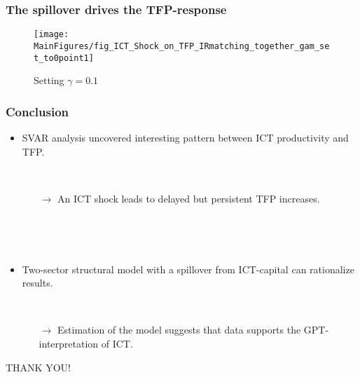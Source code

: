 \documentclass{beamer}
\def \MainFigures{../Draft_Summer2018/MainFigures}
\begin{document}
\begin{frame}
	\frametitle{The spillover drives the TFP-response}
\begin{figure}[h!]
\begin{center}
\texttt{[image: \\MainFigures/fig\_ICT\_Shock\_on\_TFP\_IRmatching\_together\_gam\_set\_to0point1]}
\caption{Setting $\gamma =0.1$}
\label{fig:TFP_main}
\end{center}
\end{figure}	

\end{frame}


\begin{frame}
	\frametitle{Conclusion}

\begin{itemize}
\item SVAR analysis uncovered interesting pattern between ICT productivity and TFP.

\

	\begin{itemize}
	\item[$\rightarrow$] An ICT shock leads to delayed but persistent TFP increases.
	\end{itemize}

\

\

\item Two-sector structural model with a spillover from ICT-capital can rationalize results.

\

	\begin{itemize}
	\item[$\rightarrow$] Estimation of the model suggests that data supports the GPT-interpretation of ICT.
	\end{itemize}
\end{itemize}

	

\end{frame}

\begin{frame}
\centering
	THANK YOU!
	

\end{frame}

\end{document}
